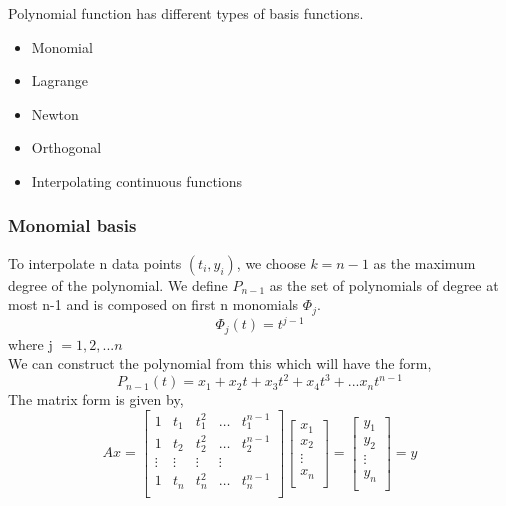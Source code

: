 \documentclass[12pt]{article}
\begin{document}
Polynomial function has different types of basis functions.
\begin{itemize}
	\item Monomial
	\item Lagrange
	\item Newton
	\item Orthogonal
	\item Interpolating continuous functions
\end{itemize}
\subsubsection{Monomial basis}
To interpolate n data points $(t_i,y_i)$, we choose $k = n-1$ as the maximum degree of the polynomial. We define $P_{n-1}$ as the set of polynomials of degree at most n-1 and is composed on first n monomials $\Phi_j$.
\begin{equation*}
\Phi_j (t) = t^{j-1} 
\end{equation*}
where j $= {1,2,...n}$\\
We can construct the polynomial from this which will have the form,\\
\begin{equation*}
P_{n-1}(t) = x_1 + x_2 t + x_3 t^2 + x_4 t^3 + ... x_n t^{n-1} 
\end{equation*}
The matrix form is given by,
\begin{equation*}
Ax = \begin{bmatrix}
1 & t_{1} & t_{1} ^2 & \dots & t_{1} ^{n-1} \\
1 & t_{2} & t_{2} ^2 & \dots & t_{2} ^{n-1} \\
\vdots & \vdots & \vdots & \vdots \\
1 & t_{n} & t_{n} ^2 & \dots & t_{n} ^{n-1} \\
\end{bmatrix}
\begin{bmatrix}
x_1  \\
x_2 \\
\vdots \\
x_n \\
\end{bmatrix} = 
\begin{bmatrix}
y_1  \\
y_2 \\
\vdots \\
y_n \\
\end{bmatrix} = y
\end{equation*} 
\end{document}
